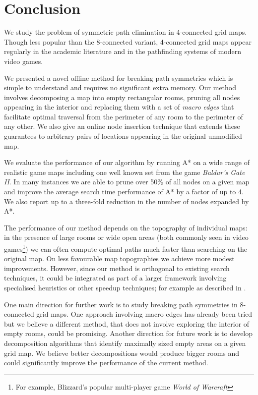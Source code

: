 \section{Conclusion}
We study the problem of symmetric path elimination in 4-connected grid maps.
Though less popular than the 8-connected variant, 4-connected grid maps appear 
regularly in the academic literature and in the pathfinding systems of modern
video games.
\par
We presented a novel offline method for breaking path symmetries which is simple
to understand and requires no significant extra memory. 
Our method involves decomposing a map into empty rectangular rooms, pruning all nodes
appearing in the interior and replacing them with a set of \emph{macro edges}
that facilitate optimal traversal from the perimeter of any room to the perimeter
of any other.
We also give an online node insertion technique that extends these guarantees
 to arbitrary pairs of locations appearing in the original unmodified map.
\par
We evaluate the performance of our algorithm by running A* on a wide
range of realistic game maps including one well known set from the game
\emph{Baldur's Gate II}. 
In many instances we are able to prune over 50\% of all nodes on a given map
and improve the average search time performance of A* by a factor of up to 4.
We also report up to a three-fold reduction in the number of nodes expanded
by A*.
\par
The performance of our method depends on the topography of individual maps: 
in the presence of large rooms or wide open areas (both commonly seen in video games\footnote{For 
example, Blizzard's popular multi-player game \emph{World of Warcraft}})
we can often compute optimal paths much faster than searching on the original map. 
On less favourable map topographies we achieve more modest improvements.
However, since our method is orthogonal to existing search techniques, it could be integrated
as part of a larger framework involving specialised heuristics or other speedup techniques; 
for example as described in \cite{botea04,bjornsson05,bjornsson06}. 
\par
One main direction for further work is to study breaking path symmetries
in 8-connected grid maps.
One approach involving macro edges has already been tried 
\cite{bolanca09} but we believe a different method, that does not involve
exploring the interior of empty rooms, could be promising.
Another direction for future work is to develop decomposition algorithms that identify maximally
sized empty areas on a given grid map.
We believe better decompositions would produce bigger rooms and could significantly improve 
the performance of the current method.

